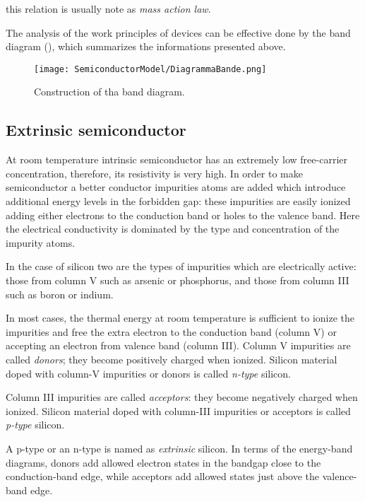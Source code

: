 this relation is usually note as \textit{mass action law}.

The analysis of the work principles of devices can be effective done by the band diagram (), which summarizes the informations presented above.
\begin{figure}[!h]
\centering
\texttt{[image: SemiconductorModel/DiagrammaBande.png]}
\caption{Construction of tha band diagram.}
\label{fig: band diagram}
\end{figure}

\subsection{Extrinsic semiconductor}
At room temperature intrinsic semiconductor has an extremely low free-carrier concentration, therefore, its resistivity is very high. In order to make semiconductor a better conductor impurities atoms are added which introduce additional energy levels in the forbidden gap: these impurities are easily ionized adding either electrons to the conduction band or holes to the valence band. Here the electrical conductivity is dominated by the type and concentration of the impurity atoms.

In the case of silicon two are the types of impurities which are electrically active: those from column V such as arsenic or phosphorus, and those from column III such as boron or indium.

 In most cases, the thermal energy at room temperature is sufficient to ionize the impurities and free the extra electron to the conduction band (column V) or accepting an electron from valence band (column III). Column V impurities are called \textit{donors}; they become positively charged when ionized. Silicon material doped with column-V impurities or donors is called \textit{n-type} silicon.

Column III impurities are called \textit{acceptors}: they become negatively charged when ionized. Silicon material doped with column-III impurities or acceptors is called \textit{p-type} silicon.

A p-type or an n-type is named as \textit{extrinsic} silicon.
In terms of the energy-band diagrams, donors add allowed electron states in the bandgap close to the conduction-band edge, while acceptors add allowed states just above the valence-band edge.

